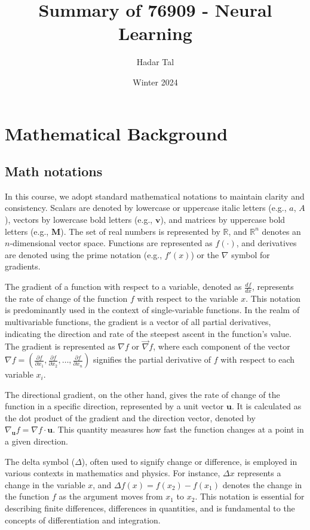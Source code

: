 \documentclass[11pt]{book} %
\title{Summary of 76909 - Neural Learning}
\author{Hadar Tal}
\date{Winter 2024}
\begin{document}
\frontmatter
\maketitle
\tableofcontents


\mainmatter
\chapter{Mathematical Background}

\section{Math notations}

In this course, we adopt standard mathematical notations to maintain clarity and consistency. Scalars are denoted by lowercase or uppercase italic letters (e.g., \(a\), \(A\)), vectors by lowercase bold letters (e.g., \(\mathbf{v}\)), and matrices by uppercase bold letters (e.g., \(\mathbf{M}\)). The set of real numbers is represented by \(\mathbb{R}\), and \(\mathbb{R}^n\) denotes an \(n\)-dimensional vector space. Functions are represented as \(f(\cdot)\), and derivatives are denoted using the prime notation (e.g., \(f'(x)\)) or the \(\nabla\) symbol for gradients.

The gradient of a function with respect to a variable, denoted as \(\frac{df}{dx}\), represents the rate of change of the function \(f\) with respect to the variable \(x\). This notation is predominantly used in the context of single-variable functions. In the realm of multivariable functions, the gradient is a vector of all partial derivatives, indicating the direction and rate of the steepest ascent in the function's value. The gradient is represented as \(\nabla f\) or \(\vec{\nabla} f\), where each component of the vector \(\nabla f = \left(\frac{\partial f}{\partial x_1}, \frac{\partial f}{\partial x_2}, \ldots, \frac{\partial f}{\partial x_n}\right)\) signifies the partial derivative of \(f\) with respect to each variable \(x_i\).

The directional gradient, on the other hand, gives the rate of change of the function in a specific direction, represented by a unit vector \(\mathbf{u}\). It is calculated as the dot product of the gradient and the direction vector, denoted by \(\nabla_{\mathbf{u}} f = \nabla f \cdot \mathbf{u}\). This quantity measures how fast the function changes at a point in a given direction.

The delta symbol (\(\Delta\)), often used to signify change or difference, is employed in various contexts in mathematics and physics. For instance, \(\Delta x\) represents a change in the variable \(x\), and \(\Delta f(x) = f(x_2) - f(x_1)\) denotes the change in the function \(f\) as the argument moves from \(x_1\) to \(x_2\). This notation is essential for describing finite differences, differences in quantities, and is fundamental to the concepts of differentiation and integration.
\end{document}
